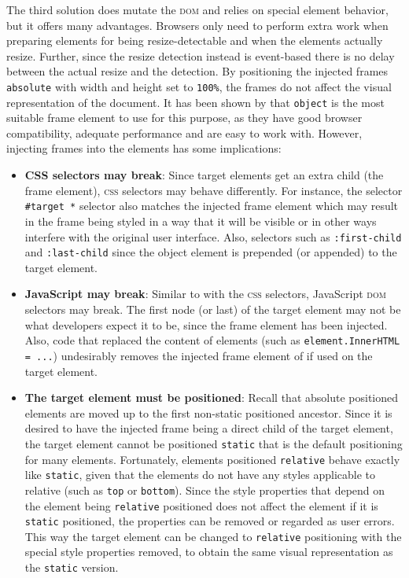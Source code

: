 \documentclass[a4paper,11pt]{kth-mag}
\newcommand{\code}[1]{\texttt{#1}}
\begin{document}
          The third solution does mutate the \textsc{dom} and relies on special element behavior, but it offers many advantages.
          Browsers only need to perform extra work when preparing elements for being resize-detectable and when the elements actually resize.
          Further, since the resize detection instead is event-based there is no delay between the actual resize and the detection.
          By positioning the injected frames \code{absolute} with width and height set to \code{100\%}, the frames do not affect the visual representation of the document.
          It has been shown by \cite{backalley} that \code{object} is the most suitable frame element to use for this purpose, as they have good browser compatibility, adequate performance and are easy to work with.
          However, injecting frames into the elements has some implications:
          \begin{itemize}
            \item \textbf{CSS selectors may break}:
              Since target elements get an extra child (the frame element), \textsc{css} selectors may behave differently.
              For instance, the selector \code{\#target *} selector also matches the injected frame element which may result in the frame being styled in a way that it will be visible or in other ways interfere with the original user interface.
              Also, selectors such as \code{:first-child} and \code{:last-child} since the object element is prepended (or appended) to the target element.
            \item \textbf{JavaScript may break}:
              Similar to with the \textsc{css} selectors, JavaScript \textsc{dom} selectors may break.
              The first node (or last) of the target element may not be what developers expect it to be, since the frame element has been injected.
              Also, code that replaced the content of elements (such as \code{element.InnerHTML = ...}) undesirably removes the injected frame element of if used on the target element.
            \item \textbf{The target element must be positioned}:
              Recall that absolute positioned elements are moved up to the first non-static positioned ancestor.
              Since it is desired to have the injected frame being a direct child of the target element, the target element cannot be positioned \code{static} that is the default positioning for many elements.
              Fortunately, elements positioned \code{relative} behave exactly like \code{static}, given that the elements do not have any styles applicable to relative (such as \code{top} or \code{bottom}).
              Since the style properties that depend on the element being \code{relative} positioned does not affect the element if it is \code{static} positioned, the properties can be removed or regarded as user errors.
              This way the target element can be changed to \code{relative} positioning with the special style properties removed, to obtain the same visual representation as the \code{static} version.
          \end{itemize}
\end{document}
